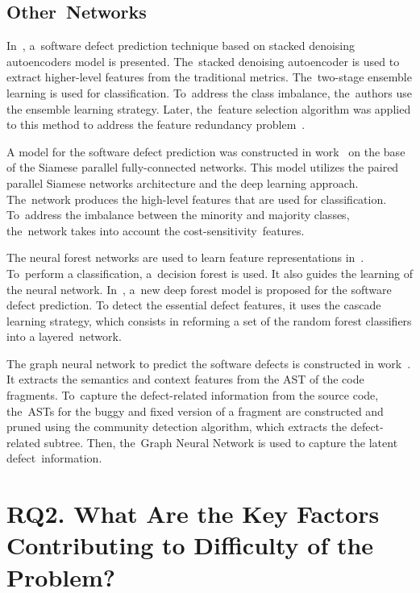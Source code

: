\documentclass[mathematics,review,accept,moreauthors,pdftex]{Definitions/mdpi}
\begin{document}
\subsection{Other~Networks}

In~\cite{TongLiuWang2018}, a~software defect prediction technique based on stacked denoising autoencoders model is presented. The~stacked denoising autoencoder is used to extract higher-level features from the traditional metrics. The~two-stage ensemble learning is used for classification. To~address the class imbalance, the~authors use the ensemble learning strategy. Later, the~feature selection algorithm was applied to this method to address the feature redundancy problem~\cite{TranHanhBinh2019}.

A model for the software defect prediction was constructed in work~\cite{ZhaoEtAl2019} on the base of the Siamese parallel fully-connected networks. This model utilizes the paired parallel Siamese networks architecture and the deep learning approach. The~network produces the high-level features that are used for classification. To~address the imbalance between the minority and majority classes, the~network takes into account the cost-sensitivity~features.

The neural forest networks are used to learn feature representations in~\cite{QiuEtAl2019}. To~perform a classification, a~decision forest is used. It also guides the learning of the neural network. 
In~\cite{ZhouEtAl2019}, a~new deep forest model is proposed for the software defect prediction. 
To detect the essential defect features, it uses the cascade learning strategy, which consists in reforming a set of the random forest classifiers into a layered~network.

The graph neural network to predict the software defects is constructed in work~\cite{XuWangAi2020}. It extracts the semantics and context features from the AST of the code fragments. To~capture the defect-related information from the source code, the~ASTs for the buggy and fixed version of a fragment are constructed and pruned using the community detection algorithm, which extracts the defect-related subtree.
Then, the~Graph Neural Network is used to capture the latent defect~information.


\section{RQ2. What Are the Key Factors Contributing to Difficulty of the Problem?} \label{sec_4}
\end{document}
